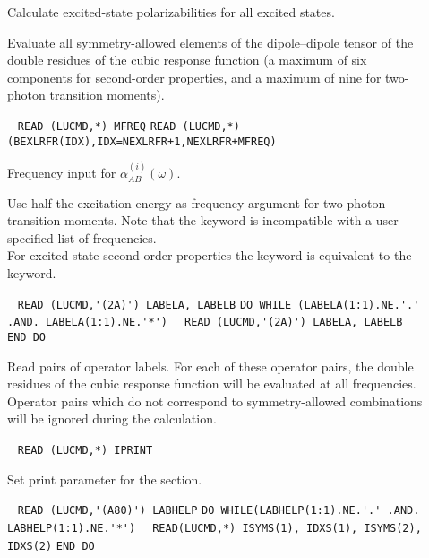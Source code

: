 \begin{description}
\item[] 
Calculate excited-state polarizabilities for all excited states.
 
\item[] 
Evaluate all symmetry-allowed elements of the dipole--dipole tensor
of the double residues of the cubic response function 
(a maximum of six components for second-order properties, and a
 maximum of nine for two-photon transition moments).
 
\item[]  \verb| |\newline
\verb|READ (LUCMD,*) MFREQ|\newline
\verb|READ (LUCMD,*) (BEXLRFR(IDX),IDX=NEXLRFR+1,NEXLRFR+MFREQ)|

Frequency input for $\alpha^{(i)}_{AB}(\omega)$.
 
\item[] 
Use half the excitation energy as frequency argument for two-photon
transition moments.
Note that the  keyword is incompatible with a 
user-specified list of frequencies. \\
For excited-state second-order properties the  keyword is
equivalent to the  keyword.
 
\item[] \verb| |\newline
\verb|READ (LUCMD,'(2A)') LABELA, LABELB|\newline
\verb|DO WHILE (LABELA(1:1).NE.'.' .AND. LABELA(1:1).NE.'*')|\newline
\verb|  READ (LUCMD,'(2A)') LABELA, LABELB|\newline
\verb|END DO|

Read pairs of operator labels.
For each of these operator pairs, the double residues of the cubic response
function will be evaluated at all frequencies.
Operator pairs which do not correspond to symmetry-allowed
combinations will be ignored during the calculation.
 
\item[] \verb| |\newline
\verb|READ (LUCMD,*) IPRINT|

Set print parameter for the  section.
 
\item[] \verb| |\newline
\verb|READ (LUCMD,'(A80)') LABHELP|\newline
\verb|DO WHILE(LABHELP(1:1).NE.'.' .AND. LABHELP(1:1).NE.'*')|\newline
\verb|  READ(LUCMD,*) ISYMS(1), IDXS(1), ISYMS(2), IDXS(2)|\newline
\verb|END DO|


\end{description}
